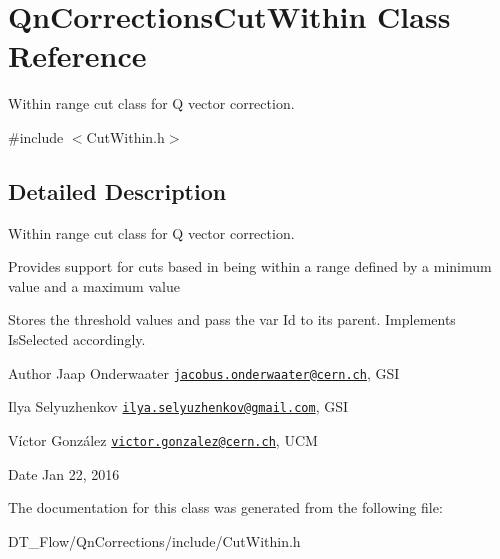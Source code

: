 \hypertarget{classQnCorrectionsCutWithin}{}\section{Qn\+Corrections\+Cut\+Within Class Reference}
\label{classQnCorrectionsCutWithin}


Within range cut class for Q vector correction.  




{\ttfamily \#include $<$Cut\+Within.\+h$>$}



\subsection{Detailed Description}
Within range cut class for Q vector correction. 

Provides support for cuts based in being within a range defined by a minimum value and a maximum value

Stores the threshold values and pass the var Id to its parent. Implements Is\+Selected accordingly.

\begin{DoxyAuthor}{Author}
Jaap Onderwaater \href{mailto:jacobus.onderwaater@cern.ch}{\tt jacobus.\+onderwaater@cern.\+ch}, G\+SI 

Ilya Selyuzhenkov \href{mailto:ilya.selyuzhenkov@gmail.com}{\tt ilya.\+selyuzhenkov@gmail.\+com}, G\+SI 

Víctor González \href{mailto:victor.gonzalez@cern.ch}{\tt victor.\+gonzalez@cern.\+ch}, U\+CM 
\end{DoxyAuthor}
\begin{DoxyDate}{Date}
Jan 22, 2016 
\end{DoxyDate}


The documentation for this class was generated from the following file\+:\begin{DoxyCompactItemize}
\item 
D\+T\+\_\+\+Flow/\+Qn\+Corrections/include/Cut\+Within.\+h\end{DoxyCompactItemize}
